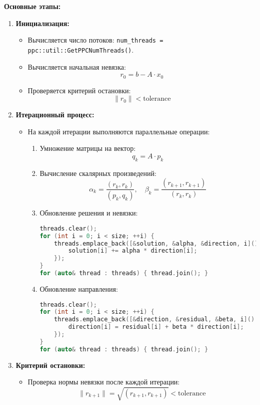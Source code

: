 \documentclass[12pt]{article}
\begin{document}
\textbf{Основные этапы:}
\begin{enumerate}
  \item \textbf{Инициализация:}
  \begin{itemize}
    \item Вычисляется число потоков: \texttt{num\_threads = ppc::util::GetPPCNumThreads()}.
    \item Вычисляется начальная невязка:
    \[
    r_0 = b - A \cdot x_0
    \]
    \item Проверяется критерий остановки:
    \[
    \|r_0\| < \text{tolerance}
    \]
  \end{itemize}

  \item \textbf{Итерационный процесс:}
  \begin{itemize}
    \item На каждой итерации выполняются параллельные операции:
    \begin{enumerate}
      \item Умножение матрицы на вектор:
      \[
      q_k = A \cdot p_k
      \]
      \item Вычисление скалярных произведений:
      \[
      \alpha_k = \frac{(r_k, r_k)}{(p_k, q_k)}, \quad \beta_k = \frac{(r_{k+1}, r_{k+1})}{(r_k, r_k)}
      \]
      \item Обновление решения и невязки:
      \begin{lstlisting}[language=C++]
threads.clear();
for (int i = 0; i < size; ++i) {
    threads.emplace_back([&solution, &alpha, &direction, i]() { 
        solution[i] += alpha * direction[i]; 
    });
}
for (auto& thread : threads) { thread.join(); }
      \end{lstlisting}
      \item Обновление направления:
      \begin{lstlisting}[language=C++]
threads.clear();
for (int i = 0; i < size; ++i) {
    threads.emplace_back([&direction, &residual, &beta, i]() { 
        direction[i] = residual[i] + beta * direction[i]; 
    });
}
for (auto& thread : threads) { thread.join(); }
      \end{lstlisting}
    \end{enumerate}
  \end{itemize}

  \item \textbf{Критерий остановки:}
  \begin{itemize}
    \item Проверка нормы невязки после каждой итерации:
    \[
    \|r_{k+1}\| = \sqrt{(r_{k+1}, r_{k+1})} < \text{tolerance}
    \]
  \end{itemize}
\end{enumerate}
\end{document}
